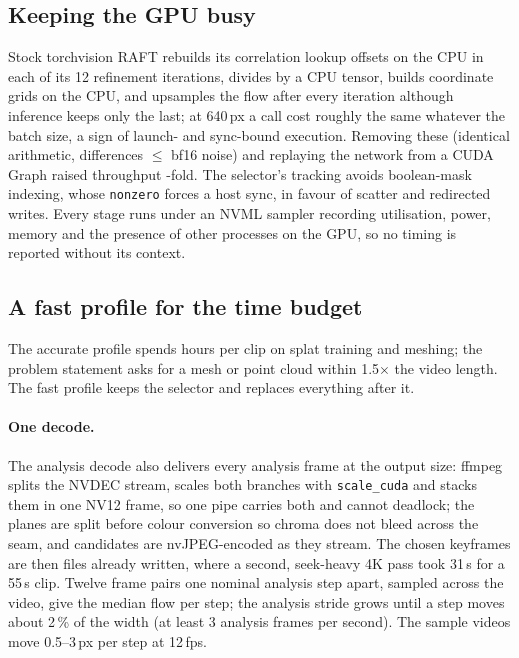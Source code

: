 \documentclass[10pt,a4paper,twocolumn]{article}
\begin{document}
\subsection{Keeping the GPU busy}
Stock torchvision RAFT rebuilds its correlation lookup offsets on the CPU in each of its 12 refinement iterations, divides by a CPU tensor, builds coordinate grids on the CPU, and upsamples the flow after every iteration although inference keeps only the last; at 640\,px a call cost roughly the same whatever the batch size, a sign of launch- and sync-bound execution. Removing these (identical arithmetic, differences $\le$ bf16 noise) and replaying the network from a CUDA Graph raised throughput \RaftSpeedup-fold. The selector's tracking avoids boolean-mask indexing, whose \texttt{nonzero} forces a host sync, in favour of scatter and redirected writes. Every stage runs under an NVML sampler recording utilisation, power, memory and the presence of other processes on the GPU, so no timing is reported without its context.

\subsection{A fast profile for the time budget}\label{sec:fast}
The accurate profile spends hours per clip on splat training and meshing; the problem statement asks for a mesh or point cloud within 1.5$\times$ the video length. The fast profile keeps the selector and replaces everything after it.

\paragraph{One decode.} The analysis decode also delivers every analysis frame at the output size: ffmpeg splits the NVDEC stream, scales both branches with \texttt{scale\_cuda} and stacks them in one NV12 frame, so one pipe carries both and cannot deadlock; the planes are split before colour conversion so chroma does not bleed across the seam, and candidates are nvJPEG-encoded as they stream. The chosen keyframes are then files already written, where a second, seek-heavy 4K pass took 31\,s for a 55\,s clip. Twelve frame pairs one nominal analysis step apart, sampled across the video, give the median flow per step; the analysis stride grows until a step moves about 2\,\% of the width (at least 3 analysis frames per second). The sample videos move 0.5--3\,px per step at 12\,fps.
\end{document}
